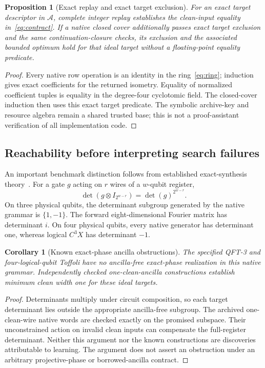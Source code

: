 \documentclass[11pt]{article}
\newtheorem{corollary}[theorem]{Corollary}
\newtheorem{proposition}[theorem]{Proposition}
\begin{document}
\begin{proposition}[Exact replay and exact target exclusion]
For an exact target descriptor in $\mathcal A$, complete integer replay establishes the clean-input equality in~\eqref{eq:contract}. If a native closed cover additionally passes exact target exclusion and the same continuation-closure checks, its exclusion and the associated bounded optimum hold for that ideal target without a floating-point equality predicate.
\end{proposition}
\begin{proof}
Every native row operation is an identity in the ring~\eqref{eq:ring}; induction gives exact coefficients for the returned isometry. Equality of normalized coefficient tuples is equality in the degree-four cyclotomic field. The closed-cover induction then uses this exact target predicate. The symbolic archive-key and resource algebra remain a shared trusted base; this is not a proof-assistant verification of all implementation code.
\end{proof}

\subsection*{Reachability before interpreting search failures}
An important benchmark distinction follows from established exact-synthesis theory~\cite{giles}. For a gate $g$ acting on $r$ wires of a $w$-qubit register,
\begin{equation}
 \det(g\otimes I_{2^{w-r}})=\det(g)^{2^{w-r}}.
\end{equation}
On three physical qubits, the determinant subgroup generated by the native grammar is $\{1,-1\}$. The forward eight-dimensional Fourier matrix has determinant $i$. On four physical qubits, every native generator has determinant one, whereas logical $C^3X$ has determinant $-1$.
\begin{corollary}[Known exact-phase ancilla obstructions]
The specified QFT-3 and four-logical-qubit Toffoli have no ancilla-free exact-phase realization in this native grammar. Independently checked one-clean-ancilla constructions establish minimum clean width one for these ideal targets.
\end{corollary}
\begin{proof}
Determinants multiply under circuit composition, so each target determinant lies outside the appropriate ancilla-free subgroup. The archived one-clean-wire native words are checked exactly on the promised subspace. Their unconstrained action on invalid clean inputs can compensate the full-register determinant. Neither this argument nor the known constructions are discoveries attributable to learning. The argument does not assert an obstruction under an arbitrary projective-phase or borrowed-ancilla contract.
\end{proof}
\end{document}
